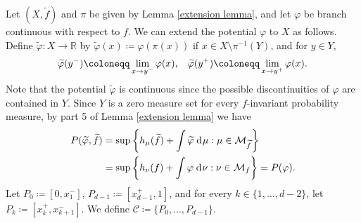 \documentclass[12pt]{amsart}
\numberwithin{equation}{section} %
\numberwithin{figure}{section} %
\theoremstyle{plain}
\theoremstyle{definition}
\theoremstyle{remark}
\theoremstyle{citing}
\newcommand{\R}{\mathbb{R}}
\renewcommand{\=}{\coloneqq}
\newcommand{\dd}{\hspace{1pt}\operatorname{d}\hspace{-1pt}}
\begin{document}
Let $(X,\widetilde{f})$ and $\pi$ be given by Lemma \ref{extension lemma}, and let $\varphi$ be branch continuous with respect to $f$. We can extend the potential $\varphi$ to $X$ as follows. Define $\widetilde{\varphi}:X\to\R$ by $\widetilde{\varphi}(x) \= \varphi(\pi(x))$ if $x\in X\setminus \pi^{-1}(Y)$, and for $y\in Y$,
    \begin{equation}\label{eq extended potential}
       \widetilde{\varphi}(y^{-}) \= \lim_{x\to y^{-}} \varphi(x),\hspace{3mm}  \widetilde{\varphi}(y^{+}) \= \lim_{x\to y^{+}} \varphi(x).
    \end{equation} 
    Note that the potential $\widetilde{\varphi}$ is continuous since the possible discontinuities of $\varphi$ are contained in $Y$.
    Since $Y$ is a zero measure set for every $f$-invariant probability measure, by part 5 of Lemma \ref{extension lemma} we have
    \begin{equation}\label{tree pressure eq1}
    \begin{split}
       P(\widetilde{\varphi},\widetilde{f}) &= \sup\left\{h_{\mu}(\widetilde{f}) + \int \widetilde{\varphi} \dd\mu : \mu \in \mathcal{M}_{\widetilde{f}}\right\}\\
       &= \sup\left\{h_{\nu}(f) + \int \varphi \dd\nu : \nu\in \mathcal{M}_f\right\} = P(\varphi).
    \end{split}
    \end{equation}
 Let $P_0 \= [0,x_1^-]$, $P_{d-1} \= [x_{d-1}^+,1]$, and for every $k\in\{1,\ldots,d-2\}$, let $P_k \= [x_k^{+},x_{k+1}^-]$. We define $\mathcal{C}\=\{P_0,\ldots,P_{d-1}\}$.
\end{document}
